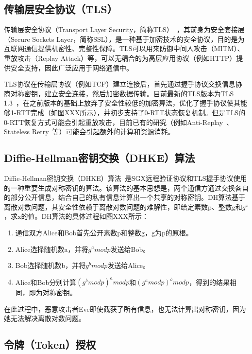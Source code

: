 \subsection{传输层安全协议（TLS）}

传输层安全协议（Transport Layer Security，简称TLS）~\cite{}，其前身为安全套接层（Secure Sockets Layer，简称SSL），是一种基于加密技术的安全协议，目的是为互联网通信提供机密性、完整性保障。TLS可以用来防御中间人攻击（MITM）、重放攻击（Replay Attack）等，可以无耦合的为高层应用协议（例如HTTP）提供安全支持，因此广泛应用于网络通信中。

TLS协议在传输层协议（例如TCP）建立连接后，首先通过握手协议交换信息协商对称密钥，建立安全连接，然后加密数据传输。目前最新的TLS版本为TLS 1.3~\cite{}，在之前版本的基础上放弃了安全性较低的加密算法，优化了握手协议使其能够1-RTT完成（如图XXX所示），并初步支持了0-RTT状态恢复机制。但是TLS的0-RTT恢复方式可能会引起重放攻击，目前已有的研究（例如Anti-Replay~\cite{}、Stateless Retry~\cite{}等）可能会引起额外的计算和资源消耗。

\subsection{Diffie-Hellman密钥交换（DHKE）算法}

Diffie-Hellman密钥交换（DHKE）算法~\cite{}是SGX远程验证协议和TLS握手协议使用的一种重要生成对称密钥的算法。该算法的基本思想是，两个通信方通过交换各自的部分公开信息，结合自己的私有信息计算出一个共享的对称密钥。DH算法基于离散对数问题，其安全性依赖于离散对数问题的难解性，即给定素数p、整数g和$g^x$，求x的值。DH算法的具体过程如图XXX所示：


\begin{enumerate}
    \item 通信双方Alice和Bob首先公开素数p和整数g，g为p的原根。
    \item Alice选择随机数a，并将$g^a mod p$发送给Bob。
    \item Bob选择随机数b，并将$g^b mod p$发送给Alice。
    \item Alice和Bob分别计算$(g^b mod p)^a mod p$和$(g^a mod p)^b mod p$，得到的结果相同，即为对称密钥。
\end{enumerate}

在此过程中，恶意攻击者Eve即使截获了所有信息，也无法计算出对称密钥，因为她无法解决离散对数问题。

\subsection{令牌（Token）授权}

